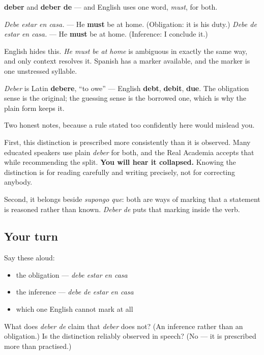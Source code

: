 \begin{cousinweb}
\textbf{deber} and \textbf{deber de} — and English uses one word, \emph{must}, for both.

\emph{Debe estar en casa.} — He \textbf{must} be at home. (Obligation: it is his duty.) \emph{Debe de estar en casa.} — He \textbf{must} be at home. (Inference: I conclude it.)

English hides this. \emph{He must be at home} is ambiguous in exactly the same way, and only context resolves it. Spanish has a marker available, and the marker is one unstressed syllable.

\emph{Deber} is Latin \textbf{debere}, \textquotedblleft{}to owe\textquotedblright{} — English \textbf{debt}, \textbf{debit}, \textbf{due}. The obligation sense is the original; the guessing sense is the borrowed one, which is why the plain form keeps it.
\end{cousinweb}

\begin{grammarlens}[title={What you've built}]
Two honest notes, because a rule stated too confidently here would mislead you.

First, this distinction is prescribed more consistently than it is observed. Many educated speakers use plain \emph{deber} for both, and the Real Academia accepts that while recommending the split. \textbf{You will hear it collapsed.} Knowing the distinction is for reading carefully and writing precisely, not for correcting anybody.

Second, it belongs beside \emph{supongo que}: both are ways of marking that a statement is reasoned rather than known. \emph{Deber de} puts that marking inside the verb.
\end{grammarlens}

\subsection*{Your turn}
Say these aloud:

\begin{itemize}
\raggedright
  \item the obligation — \emph{debe estar en casa}
  \item the inference — \emph{debe de estar en casa}
  \item which one English cannot mark at all
\end{itemize}

\begin{tcolorbox}[breakable,colback=teal!4,colframe=teal!35!black,title={Before you move on}]
What does \emph{deber de} claim that \emph{deber} does not? (An inference rather than an obligation.) Is the distinction reliably observed in speech? (No — it is prescribed more than practised.)
\end{tcolorbox}

